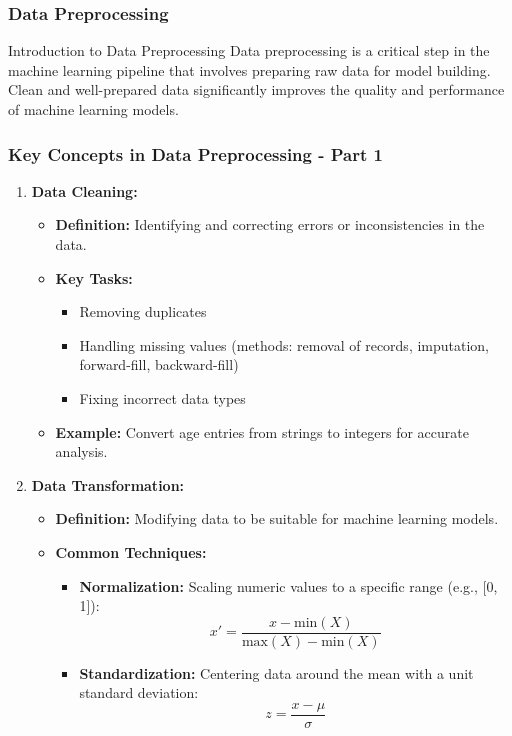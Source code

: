 \documentclass[aspectratio=169]{beamer}
\begin{document}
\begin{frame}[fragile]
    \frametitle{Data Preprocessing}
    \begin{block}{Introduction to Data Preprocessing}
        Data preprocessing is a critical step in the machine learning pipeline that involves preparing raw data for model building.
        Clean and well-prepared data significantly improves the quality and performance of machine learning models.
    \end{block}
\end{frame}

\begin{frame}[fragile]
    \frametitle{Key Concepts in Data Preprocessing - Part 1}
    \begin{enumerate}
        \item \textbf{Data Cleaning:}
        \begin{itemize}
            \item \textbf{Definition:} Identifying and correcting errors or inconsistencies in the data.
            \item \textbf{Key Tasks:}
            \begin{itemize}
                \item Removing duplicates
                \item Handling missing values (methods: removal of records, imputation, forward-fill, backward-fill)
                \item Fixing incorrect data types
            \end{itemize}
            \item \textbf{Example:} Convert age entries from strings to integers for accurate analysis.
        \end{itemize}
        
        \item \textbf{Data Transformation:}
        \begin{itemize}
            \item \textbf{Definition:} Modifying data to be suitable for machine learning models.
            \item \textbf{Common Techniques:}
            \begin{itemize}
                \item \textbf{Normalization:} Scaling numeric values to a specific range (e.g., [0, 1]):
                \begin{equation}
                    x' = \frac{x - \text{min}(X)}{\text{max}(X) - \text{min}(X)}
                \end{equation}
                \item \textbf{Standardization:} Centering data around the mean with a unit standard deviation:
                \begin{equation}
                    z = \frac{x - \mu}{\sigma}
                \end{equation}
            \end{itemize}
        \end{itemize}
    \end{enumerate}
\end{frame}
\end{document}
